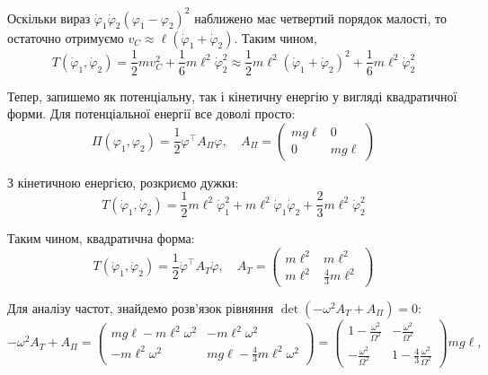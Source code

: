 \documentclass{hw_template}
\begin{document}
Оскільки вираз $\dot{\varphi}_1\dot{\varphi}_2(\varphi_1-\varphi_2)^2$ наближено
має четвертий порядок малості, то остаточно отримуємо $v_C \approx
\ell(\dot{\varphi}_1+\dot{\varphi}_2)$. Таким чином,
\begin{equation*}
    T(\dot{\varphi}_1,\dot{\varphi}_2) = \frac{1}{2}mv_C^2 + \frac{1}{6}m\ell^2\dot{\varphi}_2^2 \approx \frac{1}{2}m\ell^2(\dot{\varphi}_1+\dot{\varphi}_2)^2 + \frac{1}{6}m\ell^2\dot{\varphi}_2^2
\end{equation*}

Тепер, запишемо як потенціальну, так і кінетичну енергію у вигляді квадратичної форми. 
Для потенціальної енергії все доволі просто:
\begin{equation*}
    \Pi(\varphi_1,\varphi_2) = \frac{1}{2}\varphi^{\top}A_{\Pi}\varphi, \quad A_{\Pi} = \begin{pmatrix}
        mg\ell & 0 \\
        0 & mg\ell
    \end{pmatrix}
\end{equation*}

З кінетичною енергією, розкриємо дужки:
\begin{equation*}
    T(\dot{\varphi}_1,\dot{\varphi}_2) = \frac{1}{2}m\ell^2\dot{\varphi}_1^2 + m\ell^2\dot{\varphi}_1\dot{\varphi}_2 + \frac{2}{3}m\ell^2\dot{\varphi}_2^2
\end{equation*}

Таким чином, квадратична форма:
\begin{equation*}
    T(\dot{\varphi}_1,\dot{\varphi}_2) = \frac{1}{2}\dot{\varphi}^{\top}A_T\dot{\varphi}, \quad A_T = \begin{pmatrix}
        m\ell^2 & m\ell^2 \\
        m\ell^2 & \frac{4}{3}m\ell^2
    \end{pmatrix}
\end{equation*}

Для аналізу частот, знайдемо розв'язок рівняння $\det(-\omega^2A_T +
A_{\Pi})=0$:
\begin{equation*}
    -\omega^2A_T + A_{\Pi} = \begin{pmatrix}
        mg\ell - m\ell^2\omega^2 & -m\ell^2\omega^2 \\
        -m\ell^2\omega^2 & mg\ell - \frac{4}{3}m\ell^2\omega^2
    \end{pmatrix} = \begin{pmatrix}
        1 - \frac{\omega^2}{\Omega^2} & -\frac{\omega^2}{\Omega^2} \\
        -\frac{\omega^2}{\Omega^2} & 1 - \frac{4}{3}\frac{\omega^2}{\Omega^2}
    \end{pmatrix}mg\ell,
\end{equation*}
\end{document}
